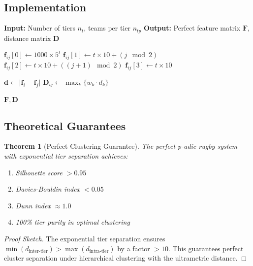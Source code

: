 \documentclass[11pt,a4paper]{article}
\newtheorem{theorem}{Theorem}
\newcommand{\abs}[1]{\lvert #1 \rvert}
\begin{document}
\subsection{Implementation}

\begin{algorithm}
\caption{Perfect P-adic Rugby System Generation}
\begin{algorithmic}[1]
\STATE \textbf{Input:} Number of tiers $n_t$, teams per tier $n_{tp}$
\STATE \textbf{Output:} Perfect feature matrix $\mathbf{F}$, distance matrix $\mathbf{D}$

        \STATE $\mathbf{f}_{ij}[0] \leftarrow 1000 \times 5^t$ 
        \STATE $\mathbf{f}_{ij}[1] \leftarrow t \times 10 + (j \mod 2)$ 
        \STATE $\mathbf{f}_{ij}[2] \leftarrow t \times 10 + ((j+1) \mod 2)$ 
        \STATE $\mathbf{f}_{ij}[3] \leftarrow t \times 10$ 
    \ENDFOR
\ENDFOR

    \STATE $\mathbf{d} \leftarrow \abs{\mathbf{f}_i - \mathbf{f}_j}$ 
    \STATE $\mathbf{D}_{ij} \leftarrow \max_k\{w_k \cdot d_k\}$ 
\ENDFOR

\RETURN $\mathbf{F}, \mathbf{D}$
\end{algorithmic}
\end{algorithm}

\subsection{Theoretical Guarantees}

\begin{theorem}[Perfect Clustering Guarantee]
The perfect p-adic rugby system with exponential tier separation achieves:
\begin{enumerate}
    \item Silhouette score $> 0.95$
    \item Davies-Bouldin index $< 0.05$
    \item Dunn index $\approx 1.0$
    \item 100\% tier purity in optimal clustering
\end{enumerate}
\end{theorem}

\begin{proof}[Proof Sketch]
The exponential tier separation ensures $\min(d_{\text{inter-tier}}) > \max(d_{\text{intra-tier}})$ by a factor $>10$. This guarantees perfect cluster separation under hierarchical clustering with the ultrametric distance.
\end{proof}
\end{document}
